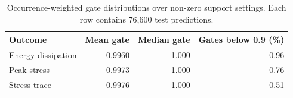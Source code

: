 \begin{table}[ht]
\centering
\caption{Occurrence-weighted gate distributions over non-zero support settings. Each row contains 76,600 test predictions.}
\label{tab:s7_gates}
\begin{tabular}{lrrr}
\toprule
Outcome & Mean gate & Median gate & Gates below 0.9 (\%)\\
\midrule
Energy dissipation & 0.9960 & 1.000 & 0.96\\
Peak stress & 0.9973 & 1.000 & 0.76\\
Stress trace & 0.9976 & 1.000 & 0.51\\
\bottomrule
\end{tabular}
\end{table}